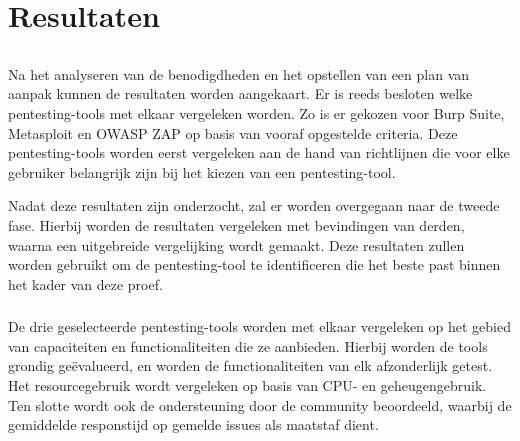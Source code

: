 
\chapter{Resultaten}%
\label{ch:resultaten}

\section{}
Na het analyseren van de benodigdheden en het opstellen van een plan van aanpak kunnen de resultaten worden aangekaart. Er is 
reeds besloten welke pentesting-tools met elkaar vergeleken worden. Zo is er gekozen voor Burp Suite, Metasploit en 
OWASP ZAP op basis van vooraf opgestelde criteria. Deze pentesting-tools worden eerst vergeleken aan de hand van richtlijnen 
die voor elke gebruiker belangrijk zijn bij het kiezen van een pentesting-tool.

Nadat deze resultaten zijn onderzocht, zal er worden overgegaan naar de tweede fase. Hierbij worden de resultaten vergeleken 
met bevindingen van derden, waarna een uitgebreide vergelijking wordt gemaakt. Deze resultaten zullen worden gebruikt om de 
pentesting-tool te identificeren die het beste past binnen het kader van deze proef.

\subsection{}
De drie geselecteerde pentesting-tools worden met elkaar vergeleken op het gebied van capaciteiten en functionaliteiten die 
ze aanbieden. Hierbij worden de tools grondig geëvalueerd, en worden de functionaliteiten van elk afzonderlijk getest. Het 
resourcegebruik wordt vergeleken op basis van CPU- en geheugengebruik. Ten slotte wordt ook de ondersteuning door de 
community beoordeeld, waarbij de gemiddelde responstijd op gemelde issues als maatstaf dient.

